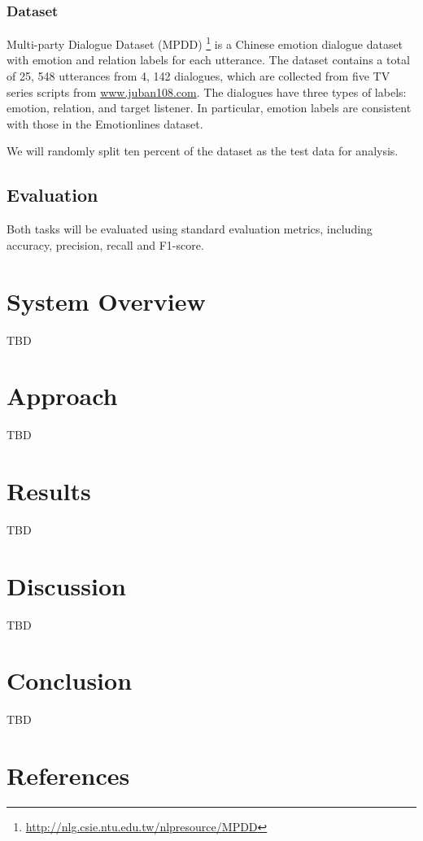 \documentclass[11pt,a4paper]{article}
\begin{document}
\subsubsection{Dataset}

Multi-party Dialogue Dataset (MPDD) \citep{chen-etal-2020-mpdd}\footnote{\url{http://nlg.csie.ntu.edu.tw/nlpresource/MPDD}} is a Chinese emotion dialogue dataset with emotion and relation labels for each utterance. The dataset contains a total of 25, 548 utterances from 4, 142 dialogues, which are collected from five TV series scripts from \url{www.juban108.com}. The dialogues have three types of labels: emotion, relation, and target listener. In particular, emotion labels are consistent with those in the Emotionlines dataset.

We will randomly split ten percent of the dataset as the test data for analysis.

\subsection{Evaluation}
Both tasks will be evaluated using standard evaluation metrics, including accuracy, precision, recall and F1-score. 

\section{System Overview}
\label{sec:overview}

TBD

\section{Approach}
\label{sec:approach}

TBD


\section{Results}
\label{sec:results}

TBD



\section{Discussion}

TBD


\section{Conclusion}
\label{sect:conclusion}

TBD

\section{References}



\end{document}
